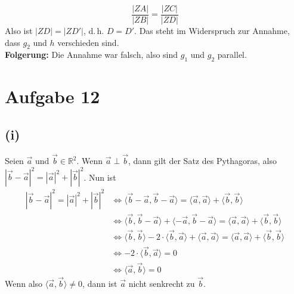 \documentclass[12pt,a4paper]{article}
\begin{document}
\[ 
    \frac{|ZA|}{|ZB|} = \frac{|ZC|}{|ZD|} 
\]
\noindent Also ist $|ZD| = |ZD'|$, d.\,h. $D = D'$. Das steht im Widerspruch zur Annahme, dass $g_2$ und $h$ verschieden sind.\\

\noindent \textbf{Folgerung:} Die Annahme war falsch, also sind $g_1$ und $g_2$ parallel.

\newpage
\section*{Aufgabe 12}
\subsection*{(i)}
Seien $\vec{a}$ und $\vec{b} \in \mathbb{R}^{2}$. Wenn $\vec{a} \perp \vec{b}$, dann gilt der Satz des Pythagoras, also $|\vec{b} - \vec{a}|^{2} = |\vec{a}|^{2} + |\vec{b}|^{2}$. Nun ist 
\begin{align*}
    |\vec{b} - \vec{a}|^{2} = |\vec{a}|^{2} + |\vec{b}|^{2} &\Leftrightarrow \langle\vec{b} - \vec{a}, \vec{b} - \vec{a} \rangle = \langle\vec{a}, \vec{a} \rangle + \langle \vec{b}, \vec{b} \rangle \\
                                                            &\Leftrightarrow \langle\vec{b}, \vec{b} - \vec{a} \rangle + \langle- \vec{a}, \vec{b} - \vec{a} \rangle  = \langle\vec{a}, \vec{a} \rangle + \langle \vec{b}, \vec{b} \rangle \\
    &\Leftrightarrow \langle\vec{b}, \vec{b}\rangle - 2\cdot \langle\vec{b},\vec{a} \rangle  + \langle \vec{a}, \vec{a} \rangle  = \langle\vec{a}, \vec{a} \rangle + \langle \vec{b}, \vec{b} \rangle \\
    &\Leftrightarrow - 2\cdot \langle\vec{b},\vec{a} \rangle = 0 \\
    &\Leftrightarrow \langle \vec{a}, \vec{b} \rangle = 0
\end{align*}
Wenn also $\langle \vec{a}, \vec{b} \rangle \neq 0$, dann ist $\vec{a}$ nicht senkrecht zu $\vec{b}$.
\end{document}
